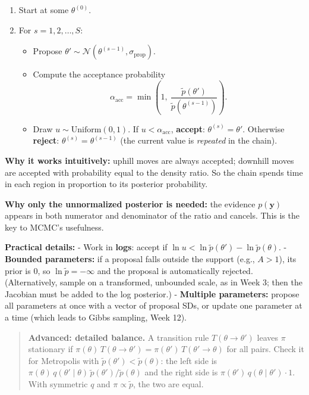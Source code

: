 \begin{enumerate}
\def\labelenumi{\arabic{enumi}.}
\tightlist
\item
  Start at some \(\theta^{(0)}\).
\item
  For \(s = 1, 2, \dots, S\):

  \begin{itemize}
  \tightlist
  \item
    Propose
    \(\theta' \sim \mathcal{N}(\theta^{(s-1)}, \sigma_{\text{prop}})\).
  \item
    Compute the acceptance probability \[
    \alpha_{\text{acc}} = \min\left(1,\ \frac{\tilde p(\theta')}{\tilde p(\theta^{(s-1)})}\right).
    \]
  \item
    Draw \(u \sim \mathrm{Uniform}(0, 1)\). If
    \(u < \alpha_{\text{acc}}\), \textbf{accept}:
    \(\theta^{(s)} = \theta'\). Otherwise \textbf{reject}:
    \(\theta^{(s)} = \theta^{(s-1)}\) (the current value is
    \emph{repeated} in the chain).
  \end{itemize}
\end{enumerate}

\textbf{Why it works intuitively:} uphill moves are always accepted;
downhill moves are accepted with probability equal to the density ratio.
So the chain spends time in each region in proportion to its posterior
probability.

\textbf{Why only the unnormalized posterior is needed:} the evidence
\(p(\mathbf{y})\) appears in both numerator and denominator of the ratio
and cancels. This is the key to MCMC's usefulness.

\textbf{Practical details:} - Work in \textbf{logs}: accept if
\(\ln u < \ln\tilde p(\theta') - \ln\tilde p(\theta)\). -
\textbf{Bounded parameters:} if a proposal falls outside the support
(e.g., \(A > 1\)), its prior is 0, so \(\ln\tilde p = -\infty\) and the
proposal is automatically rejected. (Alternatively, sample on a
transformed, unbounded scale, as in Week 3; then the Jacobian must be
added to the log posterior.) - \textbf{Multiple parameters:} propose all
parameters at once with a vector of proposal SDs, or update one
parameter at a time (which leads to Gibbs sampling, Week 12).

\begin{quote}
\textbf{Advanced: detailed balance.} A transition rule
\(T(\theta \to \theta')\) leaves \(\pi\) stationary if
\(\pi(\theta)\,T(\theta \to \theta') = \pi(\theta')\,T(\theta' \to \theta)\)
for all pairs. Check it for Metropolis with
\(\tilde p(\theta') < \tilde p(\theta)\): the left side is
\(\pi(\theta)\, q(\theta'\mid\theta)\, \tilde p(\theta')/\tilde p(\theta)\)
and the right side is \(\pi(\theta')\, q(\theta\mid\theta') \cdot 1\).
With symmetric \(q\) and \(\pi \propto \tilde p\), the two are equal.
\end{quote}

